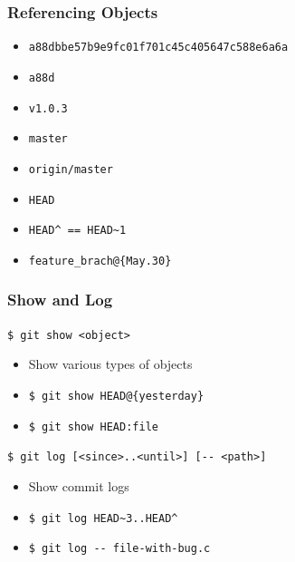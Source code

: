 \documentclass[english,compress]{beamer}
\begin{document}
\begin{frame}[fragile]
    \frametitle{Referencing Objects}

    \begin{itemize}
        \item \verb|a88dbbe57b9e9fc01f701c45c405647c588e6a6a|
        \item \verb|a88d|
        \item \verb|v1.0.3|
        \item \verb|master|
        \item \verb|origin/master|
        \item \verb|HEAD|
        \item \verb|HEAD^ == HEAD~1|
        \item \verb|feature_brach@{May.30}|
    \end{itemize}
\end{frame}

\begin{frame}[fragile]
    \frametitle{Show and Log}

    \verb|$ git show <object>|
    \begin{itemize}
        \item Show various types of objects
        \item \verb|$ git show HEAD@{yesterday}|
        \item \verb|$ git show HEAD:file|
    \end{itemize}

    \verb|$ git log [<since>..<until>] [-- <path>]|
    \begin{itemize}
        \item Show commit logs
        \item \verb|$ git log HEAD~3..HEAD^|
        \item \verb|$ git log -- file-with-bug.c|
    \end{itemize}
\end{frame}
\end{document}
